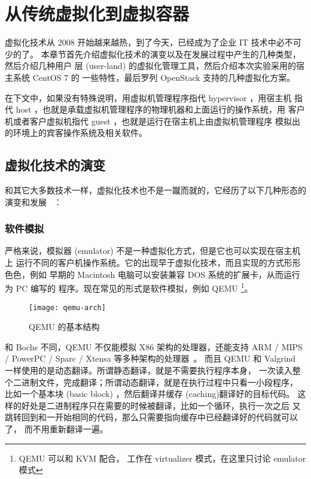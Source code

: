 \chapter{从传统虚拟化到虚拟容器}
\label{cha:virtualization-and-container}

虚拟化技术从 2008 开始越来越热，到了今天，已经成为了企业 IT 技术中必不可少的了。
本章节首先介绍虚拟化技术的演变以及在发展过程中产生的几种类型，然后介绍几种用户
层 (user-land) 的虚拟化管理工具，然后介绍本次实验采用的宿主系统 CentOS 7 的
一些特性，最后罗列 OpenStack 支持的几种虚拟化方案。

在下文中，如果没有特殊说明，用虚拟机管理程序指代 hypervisor ，用宿主机
指代 host ，也就是承载虚拟机管理程序的物理机器和上面运行的操作系统，用
客户机或者客户虚拟机指代 guest ，也就是运行在宿主机上由虚拟机管理程序
模拟出的环境上的宾客操作系统及相关软件。

\section{虚拟化技术的演变}

和其它大多数技术一样，虚拟化技术也不是一蹴而就的，它经历了以下几种形态的演变和发展
~\cite{deep-into-kvm}：

\subsection{软件模拟}

严格来说，模拟器 (emulator) 不是一种虚拟化方式，但是它也可以实现在宿主机上
运行不同的客户机操作系统。它的出现早于虚拟化技术，而且实现的方式形形色色，例如
早期的 Macintosh 电脑可以安装兼容 DOS 系统的扩展卡，从而运行为 PC 编写的
程序。现在常见的形式是软件模拟，例如 QEMU \footnote{QEMU 可以和 KVM 配合，
工作在 virtualizer 模式，在这里只讨论 emulator 模式}。

\begin{figure}[h]
    \centering
    \texttt{[image: qemu-arch]}
    \caption{QEMU 的基本结构}
\end{figure}

和 Bochs 不同，QEMU 不仅能模拟 X86 架构的处理器，还能支持 ARM / MIPS / PowerPC
 / Sparc / Xtensa 等多种架构的处理器~\cite{qemu-internals}。
而且 QEMU 和 Valgrind 一样使用的是动态翻译。所谓静态翻译，就是不需要执行程序本身，
一次读入整个二进制文件，完成翻译；所谓动态翻译，就是在执行过程中只看一小段程序，
比如一个基本块 (basic block) ，然后翻译并缓存 (caching)翻译好的目标代码。
这样的好处是二进制程序只在需要的时候被翻译，比如一个循环，执行一次之后
又跳转回到和一开始相同的代码，那么只需要指向缓存中已经翻译好的代码就可以了，
而不用重新翻译一遍。

